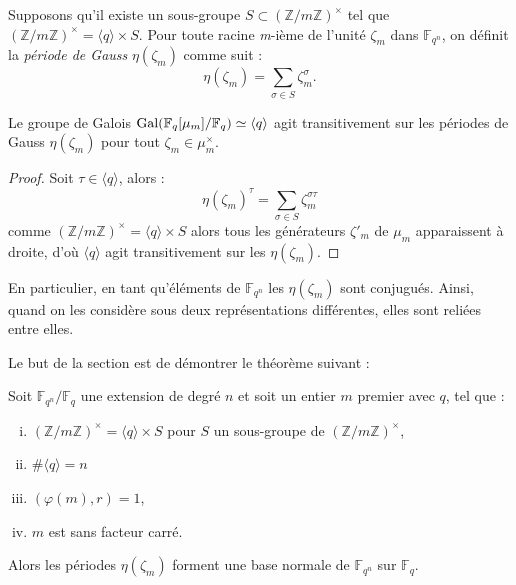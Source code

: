 \documentclass[a4paper]{article} %
\numberwithin{section}{part}
\numberwithin{equation}{section}
\newcommand\nroot[1]{\textit{#1}-ième}
\newcommand\zmodninv[1]{(\mathbb{Z}/#1\mathbb{Z})^{\times}}
\newcommand\GF[1]{\mathbb{F}_{#1}}
\newcommand\groupgen[1]{\langle{#1}\rangle}
\begin{document}
\begin{defn}
Supposons qu'il existe un sous-groupe $S\subset\zmodninv{m}$ tel que
$\zmodninv{m} = \groupgen{q}\times S$. Pour toute racine \nroot{m} de
l'unité $\zeta_m$ dans $\GF{q^n}$, on définit la \emph{période de Gauss} 
$\eta(\zeta_m)$
comme suit :
\begin{equation}
\eta(\zeta_m) = \sum_{\sigma\in S}{\zeta_m^{\sigma}}.
\end{equation}
\end{defn}
\begin{prop}
\label{prop:gaussperconj}
Le groupe de Galois $\textup{Gal}(\GF{q}[\mu_m]/\GF{q})\simeq\groupgen{q}$
agit transitivement sur les périodes de Gauss $\eta(\zeta_m)$ pour tout
$\zeta_m\in\mu_m^{\times}$.
\end{prop}
\begin{proof}
Soit $\tau\in\groupgen{q}$, alors :
\begin{equation}
\eta(\zeta_m)^{\tau} = \sum_{\sigma\in S}{\zeta_m^{\sigma\tau}}
\end{equation}
comme $\zmodninv{m} = \groupgen{q}\times S$ alors tous les générateurs
$\zeta'_m$ de $\mu_m$ apparaissent à droite, d'où $\groupgen{q}$ agit 
transitivement sur les $\eta(\zeta_m)$.
\end{proof}
\begin{rem}
En particulier, en tant qu'éléments de $\GF{q^n}$ les $\eta(\zeta_m)$ sont
conjugués. Ainsi, quand on les considère sous deux représentations différentes,
elles sont reliées entre elles.
\end{rem}
Le but de la section est de démontrer le théorème suivant :

\begin{thm}
\label{th:gausspernorm}
Soit $\GF{q^n}/\GF{q}$ une extension de degré $n$ et soit un entier $m$ premier 
avec $q$, tel que :
\vspace{0.3cm}
\begin{enumerate}[(i)]
    \item $\zmodninv{m} = \groupgen{q}\times S$ pour $S$ un sous-groupe de
        $\zmodninv{m}$,
	\item $\#\groupgen{q} = n$
    \item $(\varphi(m), r) = 1$,
    \item $m$ est sans facteur carré.
\end{enumerate}
\vspace{0.3cm}
Alors les périodes $\eta(\zeta_m)$ forment une base
normale de $\GF{q^n}$ sur $\GF{q}$.
\end{thm}
\end{document}
